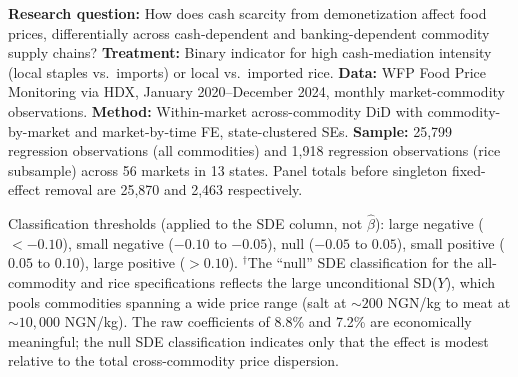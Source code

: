 \documentclass[12pt]{article}
\begin{document}
\begin{table}[H]
{\textbf{Research question:} How does cash scarcity from demonetization affect food prices, differentially across cash-dependent and banking-dependent commodity supply chains?
\textbf{Treatment:} Binary indicator for high cash-mediation intensity (local staples vs.\ imports) or local vs.\ imported rice.
\textbf{Data:} WFP Food Price Monitoring via HDX, January 2020--December 2024, monthly market-commodity observations.
\textbf{Method:} Within-market across-commodity DiD with commodity-by-market and market-by-time FE, state-clustered SEs.
\textbf{Sample:} 25,799 regression observations (all commodities) and 1,918 regression observations (rice subsample) across 56 markets in 13 states. Panel totals before singleton fixed-effect removal are 25,870 and 2,463 respectively.

Classification thresholds (applied to the SDE column, not $\hat{\beta}$):
large negative ($< -0.10$), small negative ($-0.10$ to $-0.05$),
null ($-0.05$ to $0.05$), small positive ($0.05$ to $0.10$),
large positive ($> 0.10$).
$^\dagger$The ``null'' SDE classification for the all-commodity and rice specifications reflects the large unconditional SD($Y$), which pools commodities spanning a wide price range (salt at ${\sim}200$ NGN/kg to meat at ${\sim}10{,}000$ NGN/kg). The raw coefficients of 8.8\% and 7.2\% are economically meaningful; the null SDE classification indicates only that the effect is modest relative to the total cross-commodity price dispersion.}
\end{table}
\end{document}
